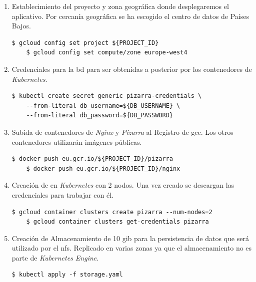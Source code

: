 \documentclass[11pt,spanish,listoffigures,listoftables]{tfgetsinf}
\begin{document}
\begin{enumerate}
	
	\item Establecimiento del proyecto y zona geográfica donde desplegaremos el aplicativo. Por cercanía geográfica se ha escogido el centro de datos de Países Bajos.
	
	\begin{lstlisting}[style=ascii-tree]
	$ gcloud config set project ${PROJECT_ID}
	$ gcloud config set compute/zone europe-west4
	\end{lstlisting}
	
\item Credenciales para la \acrshort{bd} para ser obtenidas a posterior por los contenedores de \textit{Kubernetes}.
	
	\begin{lstlisting}[style=ascii-tree]
	$ kubectl create secret generic pizarra-credentials \
	--from-literal db_username=${DB_USERNAME} \
	--from-literal db_password=${DB_PASSWORD}
	\end{lstlisting}
	
	\item Subida de \Gls{contenedor}es de \textit{Nginx} y \textit{Pizarra} al Registro de \acrshort{gce}. Los otros \Gls{contenedor}es utilizarán imágenes públicas.
	
	\begin{lstlisting}[style=ascii-tree]
	$ docker push eu.gcr.io/${PROJECT_ID}/pizarra
	$ docker push eu.gcr.io/${PROJECT_ID}/nginx
	\end{lstlisting}
	
	\item Creación de  en \textit{Kubernetes} con 2 nodos. Una vez creado se descargan las credenciales para trabajar con él.

	\begin{lstlisting}[style=ascii-tree]	
	$ gcloud container clusters create pizarra --num-nodes=2
	$ gcloud container clusters get-credentials pizarra
	\end{lstlisting}

	\item Creación de Almacenamiento de 10 \acrshort{gib} para la persistencia de datos que será utilizado por el \acrshort{nfs}. Replicado en varias zonas ya que el almacenamiento no es parte de \textit{Kubernetes Engine}.
	
	\begin{lstlisting}[style=ascii-tree]
	$ kubectl apply -f storage.yaml
	\end{lstlisting}
	

\end{enumerate}
\end{document}

